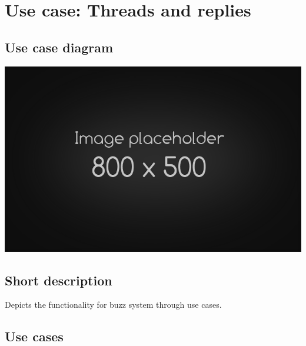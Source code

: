 \documentclass{article}
\begin{document}
\section{Use case: Threads and replies}
	\subsection{Use case diagram}
\includegraphics[width=\textwidth]{placeholder}
	\subsection{Short description}
	\begin{description}
		\item[Depicts the functionality for buzz system through use cases.] 
	\end{description}
	\subsection{Use cases}
\end{document}
